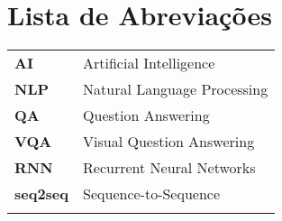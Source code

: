 \chapter{Lista de Abreviações}
\begin{tabular}{ll}
\vspace{3mm}
\textbf{AI} 		 & Artificial Intelligence\\ \vspace{3mm}
\textbf{NLP}         & Natural Language Processing\\ \vspace{3mm}
\textbf{QA}          & Question Answering\\ \vspace{3mm}
\textbf{VQA} 	     & Visual Question Answering\\ \vspace{3mm}
\textbf{RNN} 		 & Recurrent Neural Networks\\ \vspace{3mm}
\textbf{seq2seq} 	 & Sequence-to-Sequence\\ \vspace{3mm}

\end{tabular}
